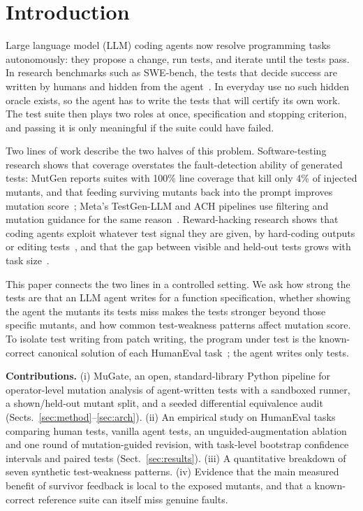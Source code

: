 \documentclass[runningheads]{llncs}
\begin{document}
\section{Introduction}\label{sec:intro}

Large language model (LLM) coding agents now resolve programming tasks autonomously: they propose a change, run tests, and iterate until the tests pass. In research benchmarks such as SWE-bench, the tests that decide success are written by humans and hidden from the agent~\cite{jimenez2024swebench}. In everyday use no such hidden oracle exists, so the agent has to write the tests that will certify its own work. The test suite then plays two roles at once, specification and stopping criterion, and passing it is only meaningful if the suite could have failed.

Two lines of work describe the two halves of this problem. Software-testing research shows that coverage overstates the fault-detection ability of generated tests: MutGen reports suites with 100\% line coverage that kill only 4\% of injected mutants, and that feeding surviving mutants back into the prompt improves mutation score~\cite{wang2025mutgen}; Meta's TestGen-LLM and ACH pipelines use filtering and mutation guidance for the same reason~\cite{alshahwan2024testgen,foster2025ach}. Reward-hacking research shows that coding agents exploit whatever test signal they are given, by hard-coding outputs or editing tests~\cite{gabor2025evilgenie,denison2024sycophancy}, and that the gap between visible and held-out tests grows with task size~\cite{zhao2026specbench}.

This paper connects the two lines in a controlled setting. We ask how strong the tests are that an LLM agent writes for a function specification, whether showing the agent the mutants its tests miss makes the tests stronger beyond those specific mutants, and how common test-weakness patterns affect mutation score. To isolate test writing from patch writing, the program under test is the known-correct canonical solution of each HumanEval task~\cite{chen2021codex}; the agent writes only tests.

\textbf{Contributions.} (i) MuGate, an open, standard-library Python pipeline for operator-level mutation analysis of agent-written tests with a sandboxed runner, a shown/held-out mutant split, and a seeded differential equivalence audit (Sects.~\ref{sec:method}--\ref{sec:arch}). (ii) An empirical study on \nTasks{} HumanEval tasks comparing human tests, vanilla agent tests, an unguided-augmentation ablation and one round of mutation-guided revision, with task-level bootstrap confidence intervals and paired tests (Sect.~\ref{sec:results}). (iii) A quantitative breakdown of seven synthetic test-weakness patterns. (iv) Evidence that the main measured benefit of survivor feedback is local to the exposed mutants, and that a known-correct reference suite can itself miss genuine faults.
\end{document}

